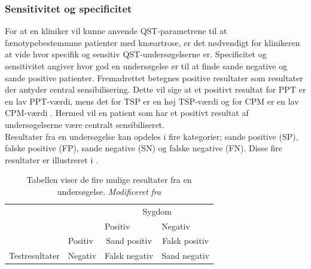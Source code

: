 \subsubsection{Sensitivitet og specificitet}
For at en kliniker vil kunne anvende QST-parametrene til at fænotypebestemmme patienter med knæartrose, er det nødvendigt for klinikeren at vide hvor specifik og sensitiv QST-undersøgelserne er. Specificitet og sensitivitet angiver hvor god en undersøgelse er til at finde sande negative og sande positive patienter. Fremadrettet betegnes positive resultater som resultater der antyder central sensibilisering. Dette vil sige at et positivt resultat for PPT er en lav PPT-værdi, mens det for TSP er en høj TSP-værdi og for CPM er en lav CPM-værdi \citep{Petersen2016}. Hermed vil en patient som har et positivt resultat af undersøgelserne være centralt sensibiliseret. \\
Resultater fra en undersøgelse kan opdeles i fire kategorier; sande positive (SP), falske positive (FP), sande negative (SN) og falske negative (FN). Disse fire resultater er illustreret i .

\begin{table}[]
\centering
\begin{tabular}{llcc}
\rowcolor[HTML]{C0C0C0} 
\cellcolor[HTML]{C0C0C0}                                 &         & \multicolumn{2}{c}{\cellcolor[HTML]{C0C0C0}Sygdom}        \\ \cline{2-4} 
\cellcolor[HTML]{C0C0C0}                                 &         & \multicolumn{1}{l}{Positiv} & \multicolumn{1}{l}{Negativ} \\
\cellcolor[HTML]{C0C0C0}                                 & Positiv & Sand positiv                & Falsk positiv               \\
\multirow{-4}{*}{\cellcolor[HTML]{C0C0C0}Testresultater} & Negativ & Falsk negativ               & Sand negativ               
\end{tabular}
\caption{Tabellen viser de fire mulige resultater fra en undersøgelse. \textit{Modificeret fra } }
\label{tab:pos_neg}
\end{table}

